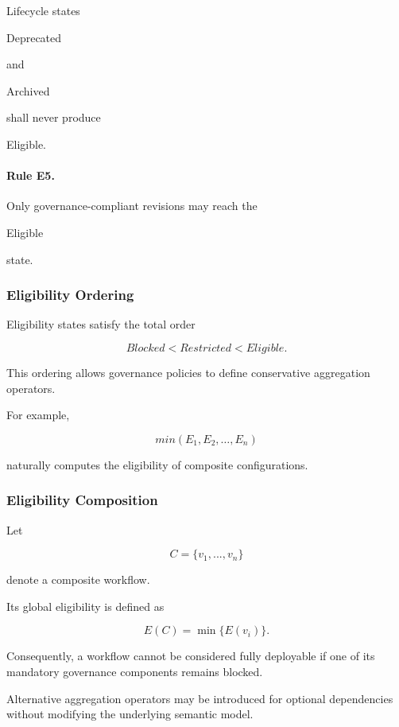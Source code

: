 \documentclass[10pt]{article}
\begin{document}
Lifecycle states

Deprecated

and

Archived

shall never produce

Eligible.


\paragraph{Rule E5.}

Only governance-compliant revisions may reach the

Eligible

state.

\subsubsection{Eligibility Ordering}

Eligibility states satisfy the total order

\[
Blocked
<
Restricted
<
Eligible.
\]

This ordering allows governance policies to define conservative aggregation
operators.

For example,

\[
min(E_1,E_2,\ldots,E_n)
\]

naturally computes the eligibility of composite configurations.

\subsubsection{Eligibility Composition}

Let

\[
C
=
\{
v_1,
...
,
v_n
\}
\]

denote a composite workflow.

Its global eligibility is defined as

\[
E(C)
=
\min
\{
E(v_i)
\}.
\]

Consequently, a workflow cannot be considered fully deployable if one of its
mandatory governance components remains blocked.

Alternative aggregation operators may be introduced for optional dependencies
without modifying the underlying semantic model.
\end{document}
